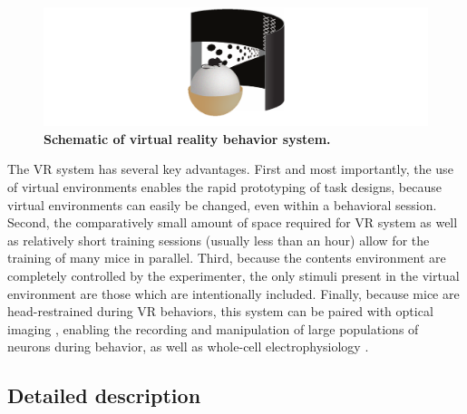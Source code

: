 \begin{figure}
\includegraphics[width=\textwidth]{figures/fig_2_1.pdf}
\caption[Schematic of virtual reality behavior system.]{\textbf{Schematic of virtual reality behavior system.}
\label{fig:2_1}}
\end{figure}

\bigskip
The VR system has several key advantages. First and most importantly, the use of virtual environments enables the rapid prototyping of task designs, because virtual environments can easily be changed, even within a behavioral session. Second, the comparatively small amount of space required for VR system as well as relatively short training sessions (usually less than an hour) allow for the training of many mice in parallel. Third, because the contents environment are completely controlled by the experimenter, the only stimuli present in the virtual environment are those which are intentionally included. Finally, because mice are head-restrained during VR behaviors, this system can be paired with optical imaging \citep{Harvey:2012du, Dombeck:2010jr}, enabling the recording and manipulation of large populations of neurons during behavior, as well as whole-cell electrophysiology \citep{Harvey:2009ci, Domnisoru:2013jp}.

\subsection{Detailed description}

